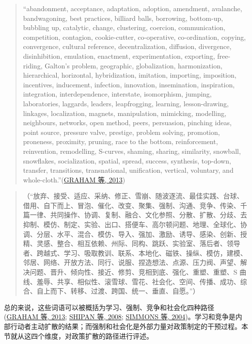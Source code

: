 \documentclass[
  12pt,
]{ctexart}
\begin{document}
\begin{quote}
``abandonment, acceptance, adaptation, adoption, amendment, avalanche, bandwagoning, best practices, billiard balls, borrowing, bottom-up, bubbling up, catalytic, change, clustering, coercion, communication, competition, contagion, cookie-cutter, co-operative, co-ordination, copying, convergence, cultural reference, decentralization, diffusion, divergence, disinhibition, emulation, enactment, experimentation, exporting, free-riding, Galton's problem, geographic, globalization, harmonization, hierarchical, horizontal, hybridization, imitation, importing, imposition, incentives, inducement, infection, innovation, insemination, inspiration, integration, interdependence, interstate, isomorphism, jumping, laboratories, laggards, leaders, leapfrogging, learning, lesson-drawing, linkages, localization, magnets, manipulation, mimicking, modelling, neighbours, networks, open method, peers, persuasion, pinching ideas, point source, pressure valve, prestige, problem solving, promotion, proneness, proximity, pruning, race to the bottom, reinforcement, reinvention, remodelling, S-curves, shaming, sharing, similarity, snowball, snowflakes, socialization, spatial, spread, success, synthesis, top-down, transfer, transitions, transnational, unification, vertical, voluntary, and whole-cloth.''(\protect\hyperlink{ref-GrahamEtAl2013}{GRAHAM 等, 2013})
\end{quote}

\begin{quote}
（``放弃、接受、适应、采纳、修正、雪崩、随波逐流、最佳实践、台球、借用、自下而上、冒泡、催化、改变、聚集、强制、沟通、竞争、传染、千篇一律、共同操作、协调、复制、融合、文化参照、分散、扩散、分歧、去抑制、模仿、制定、实验、出口、搭便车、高尔顿问题、地理、全球化、协调、分层、水平、混合、模仿、导入、强加、激励、诱导、感染、创新、授精、灵感、整合、相互依赖、州际、同构、跳跃、实验室、落后者、领导者、跨越式、学习、吸取教训、联系、本地化、磁铁、操纵、模仿，建模、邻居、网络、开放方法、同行、说服、捏造想法、点源、压力阀、声望、解决问题、晋升、倾向性、接近、修剪、竞相到底、强化、重塑、重塑、S 曲线、羞辱、共享、相似性、滚雪球、雪花、社会化、空间、传播、成功、综合、自上而下、转移、过渡、跨国、统一、垂直、自愿。''）
\end{quote}

总的来说，这些词语可以被概括为学习、强制、竞争和社会化四种路径(\protect\hyperlink{ref-GrahamEtAl2013}{GRAHAM 等, 2013}; \protect\hyperlink{ref-ShipanVolden2008}{SHIPAN 等, 2008}; \protect\hyperlink{ref-SimmonsElkins2004}{SIMMONS 等, 2004})。学习和竞争是内部行动者主动扩散的结果；而强制和社会化是外部力量对政策制定的干预过程。本节就从这四个维度，对政策扩散的路径进行评述。
\end{document}
